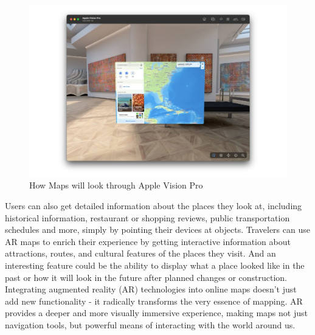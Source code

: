 \documentclass[10pt,oneside,english,a4paper]{article}
\begin{document}
\begin{figure}[h]
	\centering
	\includegraphics[scale = 0.37]{diagram7.jpg}
	\caption{How Maps will look through Apple Vision Pro \cite{Zelbo2023}}
	\label{fig:apple}
\end{figure}

Users can also get detailed information about the places they look at, including historical information, restaurant or shopping reviews, public transportation schedules and more, simply by pointing their devices at objects. Travelers can use AR maps to enrich their experience by getting interactive information about attractions, routes, and cultural features of the places they visit. And an interesting feature could be the ability to display what a place looked like in the past or how it will look in the future after planned changes or construction.
\\Integrating augmented reality (AR) technologies into online maps doesn't just add new functionality - it radically transforms the very essence of mapping. AR provides a deeper and more visually immersive experience, making maps not just navigation tools, but powerful means of interacting with the world around us.
\end{document}
